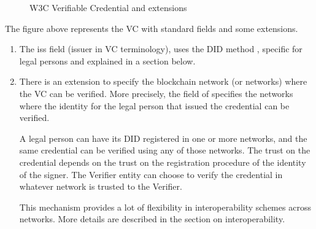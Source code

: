 \documentclass[a4paper,12pt,english]{sphinxhowto}
\begin{document}
\begin{figure}[htbp]
\centering
\capstart

\noindent{}
\caption{W3C Verifiable Credential and extensions}\label{\detokenize{ssi/privacycred:id8}}\end{figure}

\sphinxAtStartPar
The figure above represents the VC with standard fields and some extensions.
\begin{enumerate}
%
\item {} 
\sphinxAtStartPar
The iss field (issuer in VC terminology), uses the DID method , specific for legal persons and explained in a section below.

\item {} 
\sphinxAtStartPar
There is an extension to specify the blockchain network (or networks) where the VC can be verified. More precisely, the  field of  specifies the networks where the identity for the legal person that issued the credential can be verified.

\sphinxAtStartPar
A legal person can have its  DID registered in one or more networks, and the same credential can be verified using any of those networks. The trust on the credential depends on the trust on the registration procedure of the identity of the signer. The Verifier entity can choose to verify the credential in whatever network is trusted to the Verifier.

\sphinxAtStartPar
This mechanism provides a lot of flexibility in interoperability schemes across networks. More details are described in the section on interoperability.

\end{enumerate}
\end{document}
